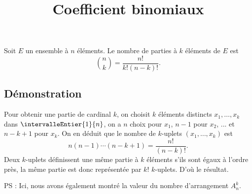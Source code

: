 \documentclass[fontsize=12pt,twoside=false,parskip=half, french]{scrartcl}
\title{Coefficient binomiaux}
\date{}
\author{}
\begin{document}
\maketitle
   \begin{Theoreme}
      Soit $E$ un ensemble à $n$ éléments. Le nombre de parties à $k$ éléments de $E$ est
      \[
         \binom{n}{k} = \frac{n!}{k!(n- k)!}.
      \]
   \end{Theoreme}
   \subsection{Démonstration}
      Pour obtenir une partie de cardinal $k$, on choisit $k$ éléments distincts $x_1, \ldots, x_k$ dans 
      $\intervalleEntier{1}{n}$, on a $n$ choix pour $x_1$, $n - 1$ pour $x_2$, ... et $n - k + 1$ pour $x_k$. On en 
      déduit que le nombre de $k$-uplets $(x_1, \ldots, x_k)$ est
      \[
         n(n - 1)\cdots(n - k + 1) = \frac{n!}{(n - k)!}.
      \]
      Deux $k$-uplets définissent une même partie à $k$ éléments s’ils sont égaux à l’ordre près, la même partie est
      donc représentée par $k!$ $k$-uplets. D’où le résultat.
      
      PS : Ici, nous avons également montré la valeur du nombre d’arrangement $A_n^k$.
\end{document}
